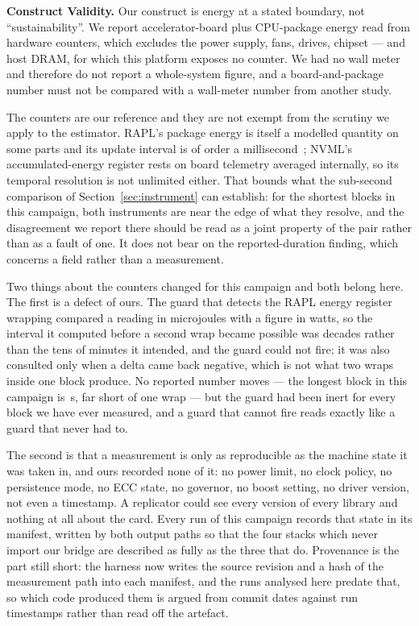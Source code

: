 \textbf{Construct Validity.}
Our construct is energy at a stated boundary, not ``sustainability''. We report
accelerator-board plus CPU-package energy read from hardware counters, which
excludes the power supply, fans, drives, chipset --- and host DRAM, for which
this platform exposes no counter. We had no wall meter and therefore do not
report a whole-system figure, and a board-and-package number must not be
compared with a wall-meter number from another study.

The counters are our reference and they are not exempt from the scrutiny we
apply to the estimator. RAPL's package energy is itself a modelled quantity on
some parts and its update interval is of order a
millisecond~\citep{khan2018rapl}; NVML's accumulated-energy register rests on
board telemetry averaged internally, so its temporal resolution is not
unlimited either. That bounds what the sub-second comparison of
Section~\ref{sec:instrument} can establish: for the shortest blocks in this
campaign, both instruments are near the edge of what they resolve, and the
disagreement we report there should be read as a joint property of the pair
rather than as a fault of one. It does not bear on the reported-duration
finding, which concerns a field rather than a measurement.

Two things about the counters changed for this campaign and both belong here. The
first is a defect of ours. The guard that detects the RAPL energy register
wrapping compared a reading in microjoules with a figure in watts, so the
interval it computed before a second wrap became possible was decades rather
than the tens of minutes it intended, and the guard could not fire; it was also
consulted only when a delta came back negative, which is not what two wraps
inside one block produce. No reported number moves --- the longest block in this
campaign is \vLongestBlockS\,\si{\second}, far short of one wrap --- but the
guard had been inert for every block we have ever measured, and a guard that
cannot fire reads exactly like a guard that never had to.

The second is that a measurement is only as reproducible as the machine state it
was taken in, and ours recorded none of it: no power limit, no clock policy, no
persistence mode, no ECC state, no governor, no boost setting, no driver
version, not even a timestamp. A replicator could see every version of every
library and nothing at all about the card. Every run of this campaign records
that state in its manifest, written by both output paths so that the four stacks
which never import our bridge are described as fully as the three that do.
Provenance is the part still short: the harness now writes the source revision
and a hash of the measurement path into each manifest, and the runs analysed
here predate that, so which code produced them is argued from commit dates
against run timestamps rather than read off the artefact.

